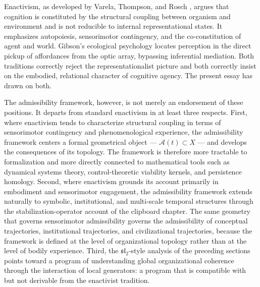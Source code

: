\documentclass[12pt,a4paper]{report}
\theoremstyle{flyxion}
\begin{document}
Enactivism, as developed by Varela, Thompson, and Rosch \cite{varela}, argues that cognition is constituted by the structural coupling between organism and environment and is not reducible to internal representational states. It emphasizes autopoiesis, sensorimotor contingency, and the co-constitution of agent and world. Gibson's ecological psychology \cite{gibson} locates perception in the direct pickup of affordances from the optic array, bypassing inferential mediation. Both traditions correctly reject the representationalist picture and both correctly insist on the embodied, relational character of cognitive agency. The present essay has drawn on both.

The admissibility framework, however, is not merely an endorsement of these positions. It departs from standard enactivism in at least three respects. First, where enactivism tends to characterize structural coupling in terms of sensorimotor contingency and phenomenological experience, the admissibility framework centers a formal geometrical object --- $\mathcal{A}(t) \subset X$ --- and develops the consequences of its topology. The framework is therefore more tractable to formalization and more directly connected to mathematical tools such as dynamical systems theory, control-theoretic viability kernels, and persistence homology. Second, where enactivism grounds its account primarily in embodiment and sensorimotor engagement, the admissibility framework extends naturally to symbolic, institutional, and multi-scale temporal structures through the stabilization-operator account of the clipboard chapter. The same geometry that governs sensorimotor admissibility governs the admissibility of conceptual trajectories, institutional trajectories, and civilizational trajectories, because the framework is defined at the level of organizational topology rather than at the level of bodily experience. Third, the $\mathfrak{sl}_2$-style analysis of the preceding sections points toward a program of understanding global organizational coherence through the interaction of local generators: a program that is compatible with but not derivable from the enactivist tradition.
\end{document}
